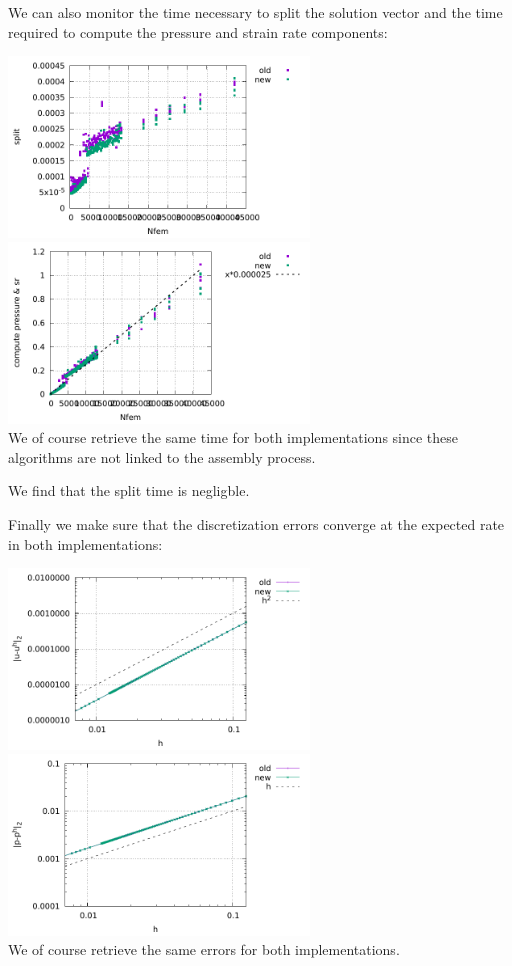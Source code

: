 We can also monitor the time necessary to split the solution vector
and the time required to compute the pressure and strain rate components:
\begin{center}
\includegraphics[width=8cm]{python_codes/fieldstone_176/results/split.pdf}
\includegraphics[width=8cm]{python_codes/fieldstone_176/results/compute_press_sr.pdf}\\
{\captionfont We of course retrieve the same time for both implementations since
these algorithms are not linked to the assembly process.}
\end{center}
We find that the split time is negligble. 


Finally we make sure that the discretization errors converge at the expected rate
in both implementations:
\begin{center}
\includegraphics[width=8cm]{python_codes/fieldstone_176/results/errv.pdf}
\includegraphics[width=8cm]{python_codes/fieldstone_176/results/errp.pdf}\\
{\captionfont We of course retrieve the same errors for both implementations.}
\end{center}
